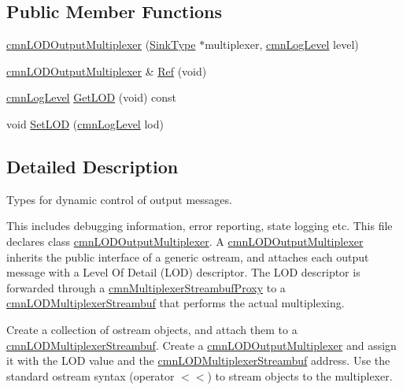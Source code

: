 \subsection*{Public Member Functions}
\begin{DoxyCompactItemize}
\item 
\hyperlink{classcmn_l_o_d_output_multiplexer_a17b986fa816c80a63425114faceb5dee}{cmn\-L\-O\-D\-Output\-Multiplexer} (\hyperlink{classcmn_l_o_d_output_multiplexer_a8020e1fe3db5ba7fb371c4554b986d6c}{Sink\-Type} $\ast$multiplexer, \hyperlink{cmn_log_lo_d_8h_a70c67165c37a0971e0dd1a85d4edaaae}{cmn\-Log\-Level} level)
\item 
\hyperlink{classcmn_l_o_d_output_multiplexer}{cmn\-L\-O\-D\-Output\-Multiplexer} \& \hyperlink{classcmn_l_o_d_output_multiplexer_a4a0452cd477f67f2dc29660ea55aca7e}{Ref} (void)
\item 
\hyperlink{cmn_log_lo_d_8h_a70c67165c37a0971e0dd1a85d4edaaae}{cmn\-Log\-Level} \hyperlink{classcmn_l_o_d_output_multiplexer_ad4735fb2cf10f4ffc5df153269e3b6d2}{Get\-L\-O\-D} (void) const 
\item 
void \hyperlink{classcmn_l_o_d_output_multiplexer_a4eef514980032c40545b4d40cc4a294b}{Set\-L\-O\-D} (\hyperlink{cmn_log_lo_d_8h_a70c67165c37a0971e0dd1a85d4edaaae}{cmn\-Log\-Level} lod)
\end{DoxyCompactItemize}


\subsection{Detailed Description}
Types for dynamic control of output messages. 

This includes debugging information, error reporting, state logging etc. This file declares class \hyperlink{classcmn_l_o_d_output_multiplexer}{cmn\-L\-O\-D\-Output\-Multiplexer}. A \hyperlink{classcmn_l_o_d_output_multiplexer}{cmn\-L\-O\-D\-Output\-Multiplexer} inherits the public interface of a generic ostream, and attaches each output message with a Level Of Detail (L\-O\-D) descriptor. The L\-O\-D descriptor is forwarded through a \hyperlink{classcmn_multiplexer_streambuf_proxy}{cmn\-Multiplexer\-Streambuf\-Proxy} to a \hyperlink{classcmn_l_o_d_multiplexer_streambuf}{cmn\-L\-O\-D\-Multiplexer\-Streambuf} that performs the actual multiplexing.

Create a collection of ostream objects, and attach them to a \hyperlink{classcmn_l_o_d_multiplexer_streambuf}{cmn\-L\-O\-D\-Multiplexer\-Streambuf}. Create a \hyperlink{classcmn_l_o_d_output_multiplexer}{cmn\-L\-O\-D\-Output\-Multiplexer} and assign it with the L\-O\-D value and the \hyperlink{classcmn_l_o_d_multiplexer_streambuf}{cmn\-L\-O\-D\-Multiplexer\-Streambuf} address. Use the standard ostream syntax (operator $<$$<$) to stream objects to the multiplexer.

